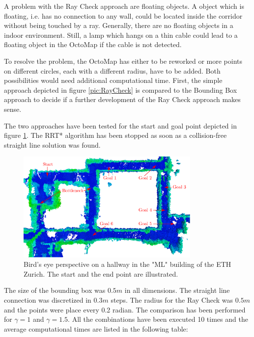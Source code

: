 A problem with the Ray Check approach are floating objects. A object which is floating, i.e. has no connection to any wall, could be located inside the corridor without being touched by a ray. Generally, there are no floating objects in a indoor environment. Still, a lamp which hangs on a thin cable could lead to a floating object in the OctoMap if the cable is not detected.\newpage

To resolve the problem, the OctoMap has either to be reworked or more points on different circles, each with a different radius, have to be added. Both possibilities would need additional computational time. First, the simple approach depicted in figure \ref{pic:RayCheck} is compared to the Bounding Box approach to decide if a further development of the Ray Check approach makes sense.\newline

The two approaches have been tested for the start and goal point depicted in figure \ref{pic:differentGoalRRT}. The RRT* algorithm has been stopped as soon as a collision-free straight line solution was found. 

\begin{figure}[H]
   \centering
   \includegraphics[trim = 0mm 86mm 94mm 0mm,clip,width=0.8\textwidth]{pics/ML4.eps}
   \caption{Bird's eye perspective on a hallway in the "ML" building of the ETH Zurich. The start and the end point are illustrated.}
   \label{pic:differentGoalRRT}
\end{figure}

The size of the bounding box was $0.5m$ in all dimensions. The straight line connection was discretized in $0.3m$ steps. The radius for the Ray Check was $0.5m$ and the points were place every 0.2 radian. The comparison has been performed for $\gamma = 1$ and $\gamma = 1.5$. All the combinations have been executed 10 times and the average computational times are listed in the following table:






